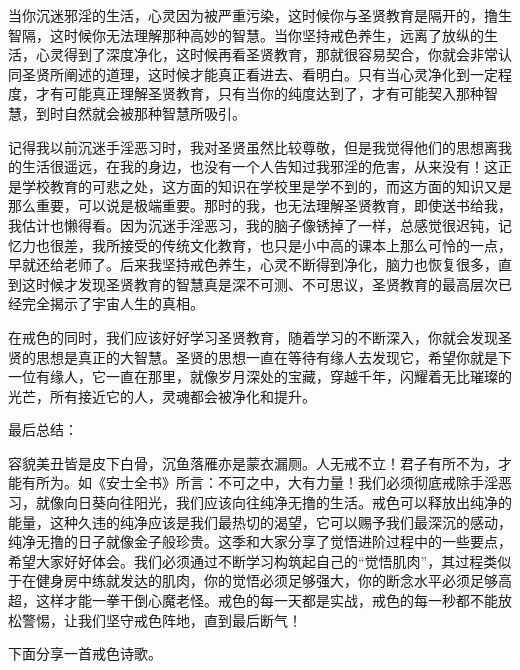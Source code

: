当你沉迷邪淫的生活，心灵因为被严重污染，这时候你与圣贤教育是隔开的，撸生智隔，这时候你无法理解那种高妙的智慧。当你坚持戒色养生，远离了放纵的生活，心灵得到了深度净化，这时候再看圣贤教育，那就很容易契合，你就会非常认同圣贤所阐述的道理，这时候才能真正看进去、看明白。只有当心灵净化到一定程度，才有可能真正理解圣贤教育，只有当你的纯度达到了，才有可能契入那种智慧，到时自然就会被那种智慧所吸引。

记得我以前沉迷手淫恶习时，我对圣贤虽然比较尊敬，但是我觉得他们的思想离我的生活很遥远，在我的身边，也没有一个人告知过我邪淫的危害，从来没有！这正是学校教育的可悲之处，这方面的知识在学校里是学不到的，而这方面的知识又是那么重要，可以说是极端重要。那时的我，也无法理解圣贤教育，即使送书给我，我估计也懒得看。因为沉迷手淫恶习，我的脑子像锈掉了一样，总感觉很迟钝，记忆力也很差，我所接受的传统文化教育，也只是小中高的课本上那么可怜的一点，早就还给老师了。后来我坚持戒色养生，心灵不断得到净化，脑力也恢复很多，直到这时候才发现圣贤教育的智慧真是深不可测、不可思议，圣贤教育的最高层次已经完全揭示了宇宙人生的真相。

在戒色的同时，我们应该好好学习圣贤教育，随着学习的不断深入，你就会发现圣贤的思想是真正的大智慧。圣贤的思想一直在等待有缘人去发现它，希望你就是下一位有缘人，它一直在那里，就像岁月深处的宝藏，穿越千年，闪耀着无比璀璨的光芒，所有接近它的人，灵魂都会被净化和提升。

最后总结：

容貌美丑皆是皮下白骨，沉鱼落雁亦是蒙衣漏厕。人无戒不立！君子有所不为，才能有所为。如《安士全书》所言：不可之中，大有力量！我们必须彻底戒除手淫恶习，就像向日葵向往阳光，我们应该向往纯净无撸的生活。戒色可以释放出纯净的能量，这种久违的纯净应该是我们最热切的渴望，它可以赐予我们最深沉的感动，纯净无撸的日子就像金子般珍贵。这季和大家分享了觉悟进阶过程中的一些要点，希望大家好好体会。我们必须通过不断学习构筑起自己的“觉悟肌肉”，其过程类似于在健身房中练就发达的肌肉，你的觉悟必须足够强大，你的断念水平必须足够高超，这样才能一拳干倒心魔老怪。戒色的每一天都是实战，戒色的每一秒都不能放松警惕，让我们坚守戒色阵地，直到最后断气！

下面分享一首戒色诗歌。

